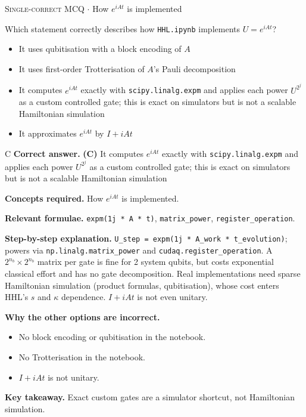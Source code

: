 \documentclass[11pt,a4paper]{article}
\newcommand{\optlabel}[1]{\textbf{(#1)}}
\newcommand{\correctlabel}[1]{\textcolor{okgreen}{\textbf{(#1)}\,\ding{51}}}
\newenvironment{qitem}[1]{\begin{list}{}{\setlength{\leftmargin}{3.3em}\setlength{\labelwidth}{3.1em}%
  \setlength{\labelsep}{0.2em}\setlength{\topsep}{3pt}\setlength{\parsep}{3pt}}\item[\textbf{Q.#1}\hfill]}{\end{list}}
\newcommand{\qsep}{\par\vspace{2pt}{\color{black!15}\hrule}\vspace{4pt}}
\newcommand{\qmeta}[2]{{\footnotesize\color{black!60}\textsc{#1} \;$\cdot$\; #2}\par}
\begin{document}
\begin{qitem}{77}
\qmeta{Single-correct MCQ}{How $e^{iAt}$ is implemented}
Which statement correctly describes how \texttt{HHL.ipynb} implements $U = e^{iAt}$?
\begin{itemize}[leftmargin=2.6em, labelsep=0.4em, itemsep=2pt, topsep=3pt]
\item[\optlabel{A}] It uses qubitisation with a block encoding of $A$
\item[\optlabel{B}] It uses first-order Trotterisation of $A$'s Pauli decomposition
\item[\correctlabel{C}] It computes $e^{iAt}$ exactly with \texttt{scipy.linalg.expm} and applies each power $U^{2^j}$ as a custom controlled gate; this is exact on simulators but is not a scalable Hamiltonian simulation
\item[\optlabel{D}] It approximates $e^{iAt}$ by $I + iAt$
\end{itemize}
\end{qitem}
\begin{solbox}{C}
\textbf{\color{brand}Correct answer.} \textcolor{okgreen}{\textbf{(C)}} It computes $e^{iAt}$ exactly with \texttt{scipy.linalg.expm} and applies each power $U^{2^j}$ as a custom controlled gate; this is exact on simulators but is not a scalable Hamiltonian simulation

\textbf{\color{brand}Concepts required.} How $e^{iAt}$ is implemented.

\textbf{\color{brand}Relevant formulae.} \texttt{expm(1j * A * t)}, \texttt{matrix\_power}, \texttt{register\_operation}.

\textbf{\color{brand}Step-by-step explanation.} \texttt{U\_step = expm(1j * A\_work * t\_evolution)}; powers via \texttt{np.linalg.matrix\_power} and \texttt{cudaq.register\_operation}. A $2^{n_b}\times2^{n_b}$ matrix per gate is fine for 2 system qubits,
but costs exponential classical effort and has no gate decomposition. Real implementations need sparse Hamiltonian simulation (product formulas, qubitisation), whose cost enters HHL's
$s$ and $\kappa$ dependence. $I + iAt$ is not even unitary.

\textbf{\color{brand}Why the other options are incorrect.}
\begin{itemize}[leftmargin=2.4em, itemsep=1pt, topsep=2pt]
\item[\textbf{(A)}] No block encoding or qubitisation in the notebook.
\item[\textbf{(B)}] No Trotterisation in the notebook.
\item[\textbf{(D)}] $I + iAt$ is not unitary.
\end{itemize}
\textbf{\color{brand}Key takeaway.} Exact custom gates are a simulator shortcut, not Hamiltonian simulation.
\end{solbox}
\qsep
\end{document}
